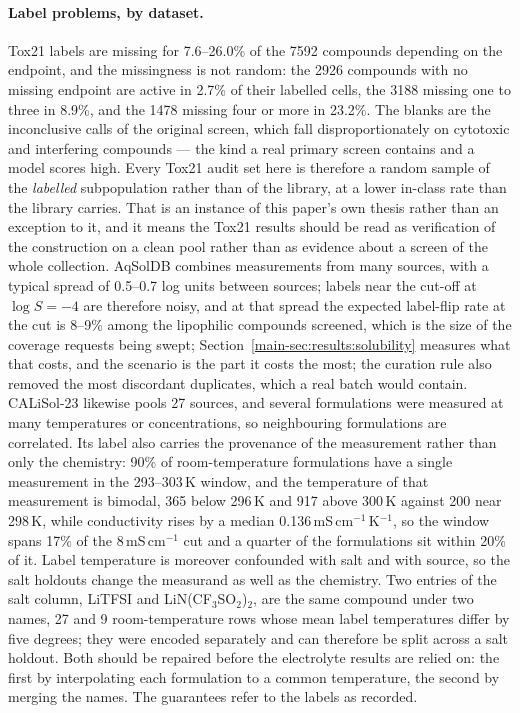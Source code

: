 \documentclass[10pt]{article}
\begin{document}
\paragraph{Label problems, by dataset.} Tox21 labels are missing for 7.6--26.0\% of the 7592 compounds depending on the endpoint, and the missingness is not random: the 2926 compounds with no missing endpoint are active in 2.7\% of their labelled cells, the 3188 missing one to three in 8.9\%, and the 1478 missing four or more in 23.2\%. The blanks are the inconclusive calls of the original screen, which fall disproportionately on cytotoxic and interfering compounds --- the kind a real primary screen contains and a model scores high. Every Tox21 audit set here is therefore a random sample of the \emph{labelled} subpopulation rather than of the library, at a lower in-class rate than the library carries. That is an instance of this paper's own thesis rather than an exception to it, and it means the Tox21 results should be read as verification of the construction on a clean pool rather than as evidence about a screen of the whole collection. AqSolDB combines measurements from many sources, with a typical spread of 0.5--0.7 log units between sources;\citep{Sorkun2019AqSolDB} labels near the cut-off at $\log S=-4$ are therefore noisy, and at that spread the expected label-flip rate at the cut is 8--9\% among the lipophilic compounds screened, which is the size of the coverage requests being swept; Section~\ref{main-sec:results:solubility} measures what that costs, and the scenario is the part it costs the most; the curation rule also removed the most discordant duplicates, which a real batch would contain. CALiSol-23 likewise pools 27 sources, and several formulations were measured at many temperatures or concentrations, so neighbouring formulations are correlated. Its label also carries the provenance of the measurement rather than only the chemistry: 90\% of room-temperature formulations have a single measurement in the 293--303\,K window, and the temperature of that measurement is bimodal, 365 below 296\,K and 917 above 300\,K against 200 near 298\,K, while conductivity rises by a median 0.136\,mS\,cm$^{-1}$\,K$^{-1}$, so the window spans 17\% of the 8\,mS\,cm$^{-1}$ cut and a quarter of the formulations sit within 20\% of it. Label temperature is moreover confounded with salt and with source, so the salt holdouts change the measurand as well as the chemistry. Two entries of the salt column, LiTFSI and LiN(CF$_3$SO$_2$)$_2$, are the same compound under two names, 27 and 9 room-temperature rows whose mean label temperatures differ by five degrees; they were encoded separately and can therefore be split across a salt holdout. Both should be repaired before the electrolyte results are relied on: the first by interpolating each formulation to a common temperature, the second by merging the names. The guarantees refer to the labels as recorded.
\end{document}
